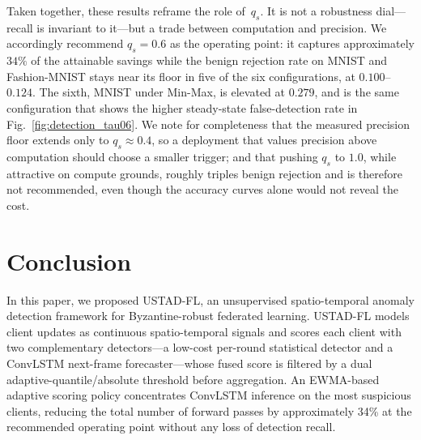 \documentclass[journal]{IEEEtran}
\begin{document}
Taken together, these results reframe the role of~$q_s$. It is not a robustness dial---recall is invariant to it---but a trade between computation and precision. We accordingly recommend $q_s = 0.6$ as the operating point: it captures approximately $34\%$ of the attainable savings while the benign rejection rate on MNIST and Fashion-MNIST stays near its floor in five of the six configurations, at $0.100$--$0.124$. The sixth, MNIST under Min-Max, is elevated at $0.279$, and is the same configuration that shows the higher steady-state false-detection rate in Fig.~\ref{fig:detection_tau06}. We note for completeness that the measured precision floor extends only to $q_s \approx 0.4$, so a deployment that values precision above computation should choose a smaller trigger; and that pushing $q_s$ to $1.0$, while attractive on compute grounds, roughly triples benign rejection and is therefore not recommended, even though the accuracy curves alone would not reveal the cost.



\section{Conclusion}
\label{sec:conclusion}

In this paper, we proposed USTAD-FL, an unsupervised spatio-temporal anomaly detection framework for Byzantine-robust federated learning. USTAD-FL models client updates as continuous spatio-temporal signals and scores each client with two complementary detectors---a low-cost per-round statistical detector and a ConvLSTM next-frame forecaster---whose fused score is filtered by a dual adaptive-quantile/absolute threshold before aggregation. An EWMA-based adaptive scoring policy concentrates ConvLSTM inference on the most suspicious clients, reducing the total number of forward passes by approximately 34\% at the recommended operating point without any loss of detection recall.
\end{document}

